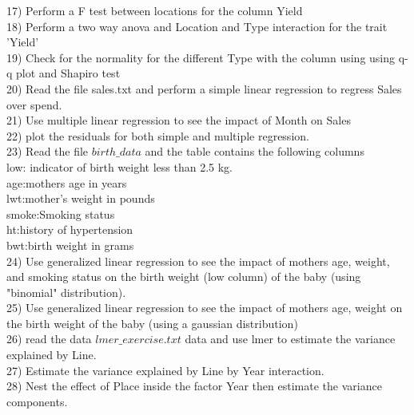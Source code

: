 \documentclass{article}
\begin{document}
17) Perform a F test between locations for the column Yield \\

18) Perform a two way anova and Location and Type interaction for the trait 'Yield'\\

19) Check for the normality for the different Type with the column using using q-q plot and Shapiro test \\

20) Read the file sales.txt and perform a simple linear regression to regress Sales over spend.\\

21) Use multiple linear regression to see the impact of Month on Sales\\

22) plot the residuals for both simple and multiple regression.\\

23) Read the file $birth\_data$ and the table contains the following columns\\

low: indicator of birth weight less than 2.5 kg.\\
age:mothers age in years\\
lwt:mother's weight in pounds\\
smoke:Smoking status\\
ht:history of hypertension\\
bwt:birth weight in grams\\

24) Use generalized linear regression to see the impact of mothers age, weight, and smoking status  on the birth weight (low column) of the baby (using "binomial" distribution).\\

25) Use generalized linear regression  to see the impact of mothers age, weight  on the birth weight of the baby (using a gaussian distribution)\\

26) read the data $lmer\_exercise.txt$ data and use lmer to estimate the variance explained by Line.\\

27) Estimate the variance explained by Line by Year interaction.\\

28) Nest the effect of Place inside the factor Year then estimate the variance components.\\
\end{document}
